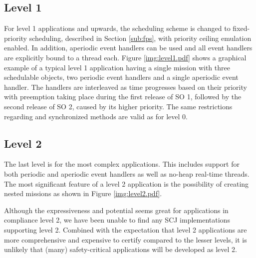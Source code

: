 \subsection{Level 1}
For level 1 applications and upwards, the scheduling scheme is changed to fixed-priority scheduling, described in Section \ref{sub:fps}, with priority ceiling emulation enabled. In addition, aperiodic event handlers can be used and all event handlers are explicitly bound to a thread each. Figure \ref{img:level1.pdf} shows a graphical example of a typical level 1 application having a single mission with three schedulable objects, two periodic event handlers and a single aperiodic event handler. The handlers are interleaved as time progresses based on their priority with preemption taking place during the first release of SO 1, followed by the second release of SO 2, caused by its higher priority. The same restrictions regarding  and synchronized methods are valid as for level 0.


\subsection{Level 2}
The last level is for the most complex applications. This includes support for both periodic and aperiodic event handlers as well as no-heap real-time threads. The most significant feature of a level 2 application is the possibility of creating nested missions as shown in Figure \ref{img:level2.pdf}.


Although the expressiveness and potential seems great for applications in compliance level 2, we have been unable to find any SCJ implementations supporting level 2. Combined with the expectation that level 2 applications are more comprehensive and expensive to certify compared to the lesser levels, it is unlikely that (many) safety-critical applications will be developed as level 2.
